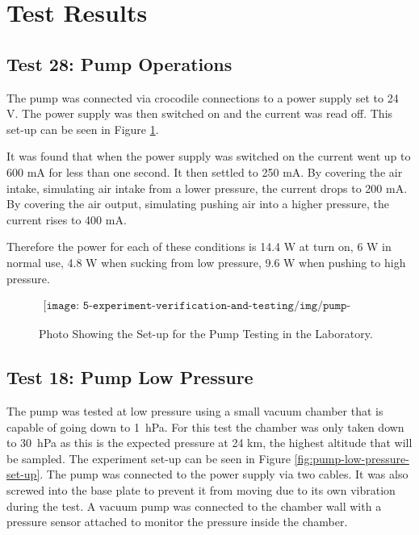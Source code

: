 \newpage
\section{Test Results} \label{sec:apptestres}

\subsection{Test 28: Pump Operations}
\label{sec:test28result}

The pump was connected via crocodile connections to a power supply set to 24 V. The power supply was then switched on and the current was read off. This set-up can be seen in Figure \ref{fig:pump-testing}.

It was found that when the power supply was switched on the current went up to 600 mA for less than one second. It then settled to 250 mA. By covering the air intake, simulating air intake from a lower pressure, the current drops to 200 mA. By covering the air output, simulating pushing air into a higher pressure, the current rises to 400 mA.

Therefore the power for each of these conditions is 14.4 W at turn on, 6 W in normal use, 4.8 W when sucking from low pressure, 9.6 W when pushing to high pressure.


\begin{figure}[H]
    \begin{align*}
        \texttt{[image: 5-experiment-verification-and-testing/img/pump-testing.png]}
    \end{align*}
    \caption{Photo Showing the Set-up for the Pump Testing in the Laboratory.} \label{fig:pump-testing}
\end{figure}

\subsection{Test 18: Pump Low Pressure}\label{subsection:pumplowpressuretest}

The pump was tested at low pressure using a small vacuum chamber that is capable of going down to \SI{1}{\hecto\pascal}. For this test the chamber was only taken down to \SI{30}{\hecto\pascal} as this is the expected pressure at 24 km, the highest altitude that will be sampled. The experiment set-up can be seen in Figure \ref{fig:pump-low-pressure-set-up}. The pump was connected to the power supply via two cables. It was also screwed into the base plate to prevent it from moving due to its own vibration during the test. A vacuum pump was connected to the chamber wall with a pressure sensor attached to monitor the pressure inside the chamber. 

